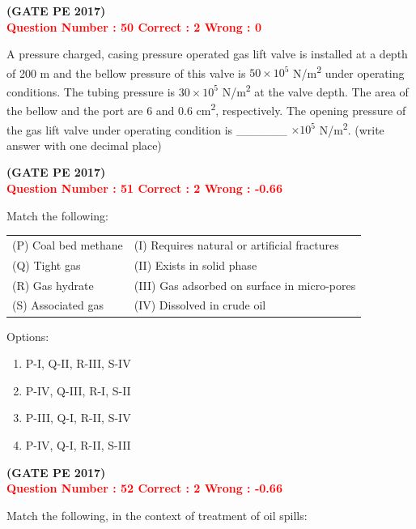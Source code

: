 \documentclass[12pt]{article}
\begin{document}
{\hfill\textbf{(GATE PE 2017)}\\[0.6cm]


\textcolor{red}{\textbf{Question Number : 50 \hfill Correct : 2  Wrong : 0}}


A pressure charged, casing pressure operated gas lift valve is installed at a depth of 200 m and the bellow pressure of this valve is $50 \times 10^5$ N/m\textsuperscript{2} under operating conditions. The tubing pressure is $30 \times 10^5$ N/m\textsuperscript{2} at the valve depth. The area of the bellow and the port are 6 and 0.6 cm\textsuperscript{2}, respectively. The opening pressure of the gas lift valve under operating condition is \_\_\_\_\_\_ $\times 10^5$ N/m\textsuperscript{2}. (write answer with one decimal place)

\hfill\textbf{(GATE PE 2017)}\\[0.6cm]


\textcolor{red}{\textbf{Question Number : 51 \hfill Correct : 2  Wrong : -0.66}}


Match the following:\\[0.6cm]

\begin{tabular}{ll}
(P) Coal bed methane & (I) Requires natural or artificial fractures \\
(Q) Tight gas        & (II) Exists in solid phase \\
(R) Gas hydrate      & (III) Gas adsorbed on surface in micro-pores \\
(S) Associated gas   & (IV) Dissolved in crude oil \\
\end{tabular}


Options:
\begin{enumerate}[label=(\Alph*)]
    \item P-I, Q-II, R-III, S-IV  
    \item P-IV, Q-III, R-I, S-II  
    \item P-III, Q-I, R-II, S-IV  
    \item P-IV, Q-I, R-II, S-III  
\end{enumerate}
\hfill\textbf{(GATE PE 2017)}\\[0.6cm]

\textcolor{red}{\textbf{Question Number : 52 \hfill Correct : 2  Wrong : -0.66}}


Match the following, in the context of treatment of oil spills:\\[0.6cm]


}
\end{document}
